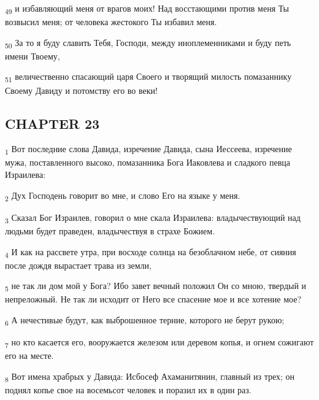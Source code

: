 \begin{tcolorbox}
\textsubscript{49} и избавляющий меня от врагов моих! Над восстающими против меня Ты возвысил меня; от человека жестокого Ты избавил меня.
\end{tcolorbox}
\begin{tcolorbox}
\textsubscript{50} За то я буду славить Тебя, Господи, между иноплеменниками и буду петь имени Твоему,
\end{tcolorbox}
\begin{tcolorbox}
\textsubscript{51} величественно спасающий царя Своего и творящий милость помазаннику Своему Давиду и потомству его во веки!
\end{tcolorbox}
\subsection{CHAPTER 23}
\begin{tcolorbox}
\textsubscript{1} Вот последние слова Давида, изречение Давида, сына Иессеева, изречение мужа, поставленного высоко, помазанника Бога Иаковлева и сладкого певца Израилева:
\end{tcolorbox}
\begin{tcolorbox}
\textsubscript{2} Дух Господень говорит во мне, и слово Его на языке у меня.
\end{tcolorbox}
\begin{tcolorbox}
\textsubscript{3} Сказал Бог Израилев, говорил о мне скала Израилева: владычествующий над людьми будет праведен, владычествуя в страхе Божием.
\end{tcolorbox}
\begin{tcolorbox}
\textsubscript{4} И как на рассвете утра, при восходе солнца на безоблачном небе, от сияния после дождя вырастает трава из земли,
\end{tcolorbox}
\begin{tcolorbox}
\textsubscript{5} не так ли дом мой у Бога? Ибо завет вечный положил Он со мною, твердый и непреложный. Не так ли исходит от Него все спасение мое и все хотение мое?
\end{tcolorbox}
\begin{tcolorbox}
\textsubscript{6} А нечестивые будут, как выброшенное терние, которого не берут рукою;
\end{tcolorbox}
\begin{tcolorbox}
\textsubscript{7} но кто касается его, вооружается железом или деревом копья, и огнем сожигают его на месте.
\end{tcolorbox}
\begin{tcolorbox}
\textsubscript{8} Вот имена храбрых у Давида: Исбосеф Ахаманитянин, главный из трех; он поднял копье свое на восемьсот человек и поразил их в один раз.
\end{tcolorbox}
